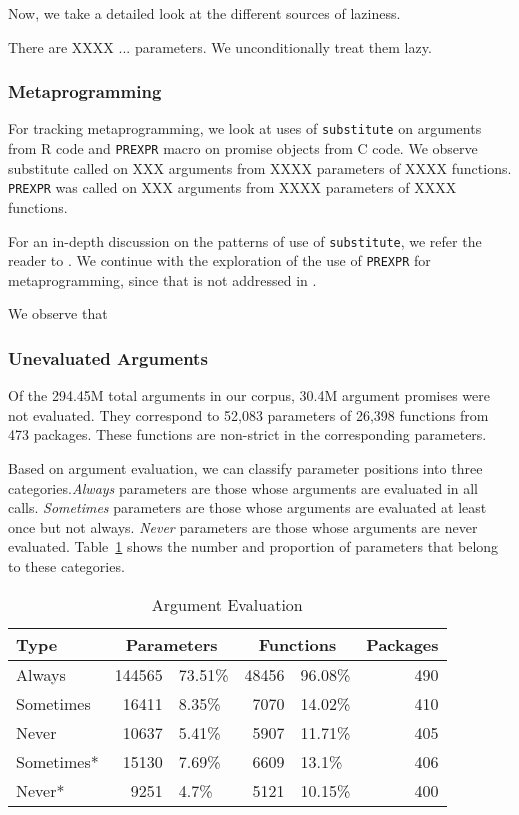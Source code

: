 \documentclass[review,nonacm,screen,acmsmall,anonymous=true]{acmart}
\newcommand{\always}{\emph{Always}\xspace}
\newcommand{\sometimes}{\emph{Sometimes}\xspace}
\newcommand{\never}{\emph{Never}\xspace}
\newcommand{\code}[1]{\lstinline |#1|\xspace}
\begin{document}
Now, we take a detailed look at the different sources of laziness.

There are XXXX $...$ parameters. We unconditionally treat them lazy.

\subsubsection{Metaprogramming}
For tracking metaprogramming, we look at uses of \code{substitute} on arguments
from R code and \code{PREXPR} macro on promise objects from C code. We observe
substitute called on XXX arguments from XXXX parameters of XXXX functions.
\code{PREXPR} was called on XXX arguments from XXXX parameters of XXXX
functions.

For an in-depth discussion on the patterns of use of \code{substitute}, we refer
the reader to \citet{oopsla19b}. We continue with the exploration of the use of
\code{PREXPR} for metaprogramming, since that is not addressed in
\cite{oopsla19b}.

We observe that 




\subsubsection{Unevaluated Arguments}
Of the 294.45M total arguments in our corpus, 30.4M argument promises were not
evaluated. They correspond to 52,083 parameters of 26,398 functions from 473
packages. These functions are non-strict in the corresponding parameters.

Based on argument evaluation, we can classify parameter positions into three
categories.\always parameters are those whose arguments are evaluated in all
calls. \sometimes parameters are those whose arguments are evaluated at least
once but not always. \never parameters are those whose arguments are never
evaluated. Table~\ref{table:argeval} shows the number and proportion of
parameters that belong to these categories.

\begin{table}[!h]
  \vspace{-3mm}
  \caption{Argument Evaluation}\label{table:argeval}
  \vspace{-3mm}
  \begin{tabular}{lr|lr|lr}
    \toprule
    \textbf{Type}&\multicolumn{2}{c}{\textbf{Parameters}}&\multicolumn{2}{c}{\textbf{Functions}}&\textbf{Packages}\\
    \midrule
    Always&144565&73.51\%&48456&96.08\%&490\\
    Sometimes&16411&8.35\%&7070&14.02\%&410\\
    Never&10637&5.41\%&5907&11.71\%&405\\
    \midrule
    Sometimes*&15130&7.69\%&6609&13.1\%&406\\
    Never*&9251&4.7\%&5121&10.15\%&400\\
    \bottomrule
  \end{tabular}
\end{table}
\end{document}

